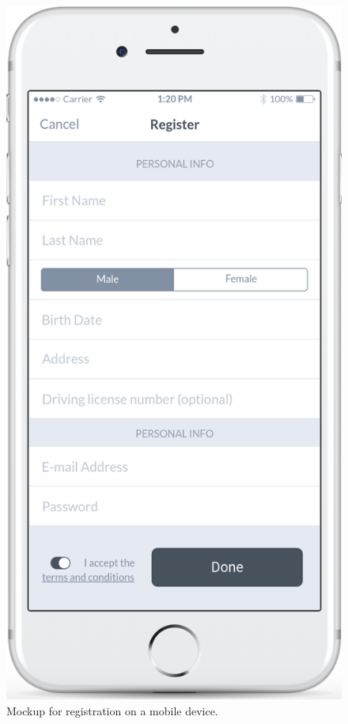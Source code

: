 \documentclass{article}
\begin{document}
	\begin{figure}[h!]
		\bigskip
		\centering
		\includegraphics[scale=0.25]{img/mockups/register_m.png}
		\caption{Mockup for registration on a mobile device.}
	\end{figure}
\end{document}
